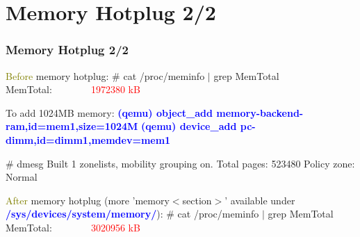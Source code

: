 \documentclass[aspectratio=169]{beamer}
\begin{document}

\section{Memory Hotplug 2/2}
\begin{frame}
\frametitle{Memory Hotplug 2/2}
\begin{block}{}
\small
\textcolor{olive}{Before} memory hotplug: \newline
\# cat /proc/meminfo $|$ grep MemTotal \newline
MemTotal:\ \ \ \ \ \ \ \ \textcolor{red}{1972380 kB} \newline

To add 1024MB memory: \newline
\textbf{\textcolor{blue}{(qemu) object\_add memory-backend-ram,id=mem1,size=1024M}} \newline
\textbf{\textcolor{blue}{(qemu) device\_add pc-dimm,id=dimm1,memdev=mem1}} \newline

\# dmesg \newline
[   99.324281] Built 1 zonelists, mobility grouping on.  Total pages: 523480 \newline
[   99.324282] Policy zone: Normal \newline

\textcolor{olive}{After} memory hotplug (more 'memory$<$section$>$' available under \textbf{\textcolor{blue}{/sys/devices/system/memory/}}): \newline
\# cat /proc/meminfo $|$ grep MemTotal \newline
MemTotal:\ \ \ \ \ \ \ \ \textcolor{red}{3020956 kB}

\end{block}
\end{frame}

\end{document}
